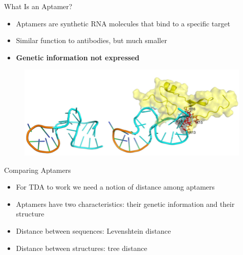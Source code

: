 \documentclass{beamer}
\begin{document}
\begin{frame}{What Is an Aptamer?}
\begin{itemize}
  \item Aptamers are synthetic RNA molecules that bind to a specific target
  \item Similar function to antibodies, but much smaller
  \item \textbf{Genetic information not expressed}
\end{itemize}
\begin{figure}
  \begin{center}
    \includegraphics[width=1\textwidth]{aptamer.png}\cite{aptamer}
  \end{center}  
\end{figure}
\end{frame}

\begin{frame}{Comparing Aptamers}
  \begin{itemize}
    \item For TDA to work we need a notion of distance among aptamers
    \item Aptamers have two characteristics: their genetic information and their structure
    \item Distance between sequences: Levenshtein distance
    \item Distance between structures: tree distance
  \end{itemize}
\end{frame}
\end{document}
